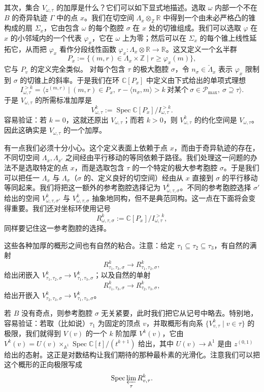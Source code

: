 其次，集合 $V_{\omega,\tau}$ 的加厚是什么？它们可以如下显式地描述。选取 $\omega$ 内部一个不在 $B$ 的奇异轨迹 $\Gamma$ 中的点 $x$。我们在切空间 $\Lambda_x\otimes_{\mathbb{Z}}\mathbb{R}$ 中得到一个由未必严格凸的锥构成的扇 $\Sigma_x$，它由包含 $\omega$ 的每个胞腔 $\sigma$ 在 $x$ 处的切锥组成。我们可以选取 $\varphi$ 在 $x$ 的小邻域内的一个代表 $\varphi_x$，它在 $\omega$ 上为零；然后可以在 $\Sigma_x$ 的每个锥上线性延拓它，从而把 $\varphi_x$ 看作分段线性函数 $\varphi_x:\Lambda_x\otimes\mathbb{R}\to\mathbb{R}$。这又定义一个幺半群
\[
P_x:=\{(m,r)\in\Lambda_x\times\mathbb{Z}\mid r\ge\varphi_x(m)\},
\]
它与 $P_v$ 的定义完全类似。
对每个包含 $\tau$ 的极大胞腔 $\sigma$，令 $n_\sigma\in\check\Lambda_x$ 表示 $\varphi_x$ 限制到 $\sigma$ 的切锥上的斜率。于是我们在环 $\mathbb{C}[P_x]$ 中定义由下式给出的单项式理想
\[
I_{\omega,\tau}^{>k}=\big\langle z^{(m,r)}\ \big|\ (m,r)\in P_x,\ r-\langle n_\sigma,m\rangle>k\ \text{对某个}\ \sigma\in\mathcal{P}_{\max},\ \sigma\supseteq\tau\big\rangle.
\]
于是 $V_{\omega,\tau}$ 的所需标准加厚是
\[
V_{\omega,\tau}^k:=\operatorname{Spec}\mathbb{C}[P_x]/I_{\omega,\tau}^{>k}.
\]
容易验证：若 $k=0$，这就还原出 $V_{\omega,\tau}$；而若 $k>0$，则 $V_{\omega,\tau}^k$ 的约化空间是 $V_{\omega,\tau}$。因此这确实是 $V_{\omega,\tau}$ 的一个加厚。

有一点我们必须十分小心。这个定义表面上依赖于点 $x$，而由于奇异轨迹的存在，不同切空间 $\Lambda_x,\Lambda_{x'}$ 之间经由平行移动的等同依赖于路径。我们处理这一问题的办法不是选取特定的点 $x$，而是选取包含 $\tau$ 的一个特定的极大参考胞腔 $\sigma$。于是我们可以把任一 $\Lambda_x$ 与 $\Lambda_\sigma$（$\sigma$ 的、定义良好的切空间）经由从 $x$ 直接到 $\sigma$ 的平行移动等同起来。我们将把这一额外的参考胞腔选择记为 $V_{\omega,\tau,\sigma}^k$。不同的参考胞腔选择 $\sigma'$ 给出的空间 $V_{\omega,\tau,\sigma'}^k$ 与 $V_{\omega,\tau,\sigma}^k$ 抽象地同构，但不是典范同构。这一点在下面将会变得重要。我们还对坐标环使用记号
\[
R_{\omega,\tau,\sigma}^k:=\mathbb{C}[P_x]/I_{\omega,\tau}^{>k},
\]
同样要记住这一参考胞腔的选择。

这些各种加厚的概形之间也有自然的粘合。注意：给定 $\tau_1\subseteq\tau_2\subseteq\tau_3$，有自然的满射
\[
R_{\tau_1,\tau_3,\sigma}^k\to R_{\tau_1,\tau_2,\sigma}^k,
\]
给出闭嵌入 $V_{\tau_1,\tau_2,\sigma}^k\to V_{\tau_1,\tau_3,\sigma}^k$；以及自然的单射
\[
R_{\tau_1,\tau_3,\sigma}^k\to R_{\tau_2,\tau_3,\sigma}^k,
\]
给出开嵌入 $V_{\tau_2,\tau_3,\sigma}^k\to V_{\tau_1,\tau_3,\sigma}^k$。

若 $B$ 没有奇点，则参考胞腔 $\sigma$ 无关紧要，此时我们把它从记号中略去。特别地，容易验证：若取（比如说）$\tau_1$ 为固定的顶点 $v$，并取概形有向系 $\{V_{v,\tau}^k\mid v\in\tau\}$ 的极限，我们就得到 $V(v)$ 的一个 $k$ 阶加厚 $V^k(v)$，它由 $V^k(v)=U(v)\times_{\mathbb{A}^1}\operatorname{Spec}\mathbb{C}[t]/(t^{k+1})$ 给出，其中 $U(v)\to\mathbb{A}^1$ 是由 $z^{(0,1)}$ 给出的态射。这正是对数结构让我们期待的那种最朴素的光滑化。注意我们可以把这个概形的正向极限写成
\[
\operatorname{Spec}\varprojlim_{\tau}R_{v,\tau}^k.
\]

